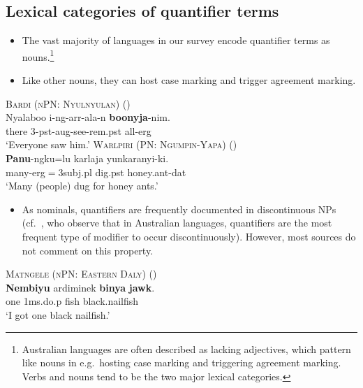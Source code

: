 \documentclass{article}
\begin{document}
\subsection{Lexical categories of quantifier terms}

\begin{itemize}
\item The vast majority of languages in our survey encode quantifier terms as nouns.\footnote{Australian languages are often described as lacking adjectives, which pattern like nouns in e.g.\ hosting case marking and triggering agreement marking. Verbs and nouns tend to be the two major lexical categories.}
\item Like other nouns, they can host case marking and trigger agreement marking.
\end{itemize}

\begin{exe}
  \ex\label{allerg} \textsc{Bardi (nPN: Nyulnyulan)} (\citealt[272]{bowern12})\\
  \gll Nyalaboo i-ng-arr-ala-n \textbf{boonyja}-nim.\\
  there 3-{\sc pst}-{\sc aug}-see-{\sc rem.pst} all-{\sc erg}\\
  \glt `Everyone saw him.'
  \ex \textsc{Warlpiri (PN: Ngumpin-Yapa)} (\citealt[6]{bowler17})\\
  \gll \textbf{Panu}-ngku=lu karlaja yunkaranyi-ki.\\
  many-{\sc erg}$=${\sc 3subj.pl} dig.{\sc pst} honey.ant-{\sc dat}\\
  \glt `Many (people) dug for honey ants.'
\end{exe}

\begin{itemize}
\item As nominals, quantifiers are frequently documented in discontinuous NPs (cf.\ \citealt[51--52]{louagieverstraete16}, who observe that in Australian languages, quantifiers are the most frequent type of modifier to occur discontinuously). However, most sources do not comment on this property.
\end{itemize}

\begin{exe}
  \ex \textsc{Matngele (nPN: Eastern Daly)} (\citealt[54]{zandvoort99})\\
  \gll \textbf{Nembiyu} ardiminek \textbf{binya} \textbf{jawk}.\\
  one 1{\sc ms.}do.{\sc p} fish black.nailfish\\
  \glt `I got one black nailfish.' %
\end{exe}
\end{document}
